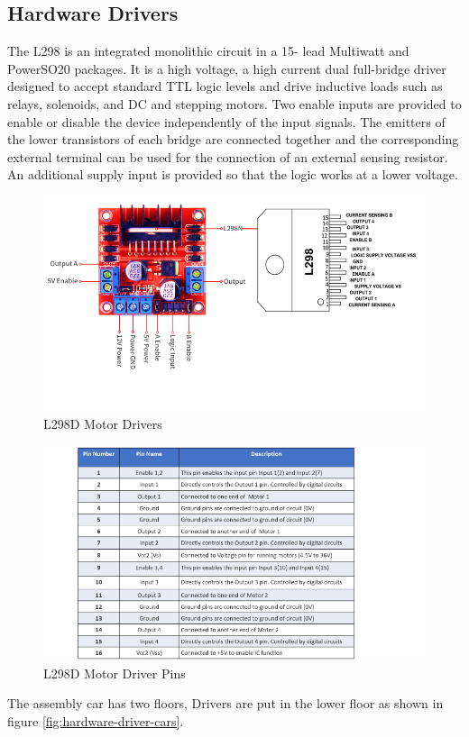 \subsection{Hardware Drivers}

The L298 is an integrated monolithic circuit in a 15- lead Multiwatt and PowerSO20 packages. It is a high voltage, a high current dual full-bridge driver designed to accept standard TTL logic levels and drive inductive loads such as relays, solenoids, and DC and stepping motors. Two enable inputs are provided to enable or disable the device independently of the input signals. The emitters of the lower transistors of each bridge are connected together and the corresponding external terminal can be used for the connection of an external sensing resistor. An additional supply input is provided so that the logic works at a lower voltage.

\begin{figure}[h]
    \centering
    \includegraphics[scale=.4]{figures/9-10.png}
    \caption{L298D Motor Drivers}
\end{figure}

\begin{figure}[h]
    \centering
    \includegraphics[scale=.5]{figures/9-11.png}
    \caption{L298D Motor Driver Pins}
\end{figure}
\newpage
The assembly car has two floors, Drivers are put in the lower floor as shown in figure \ref{fig:hardware-driver-cars}.

